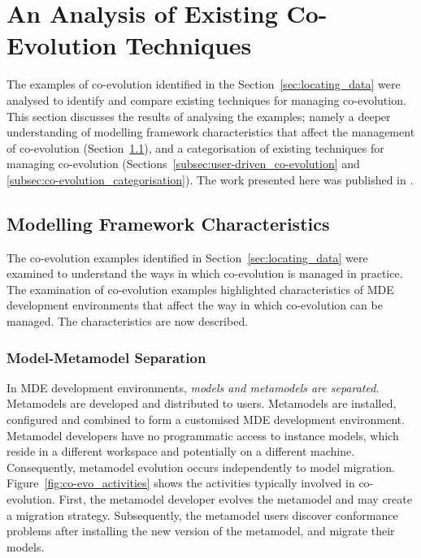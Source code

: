 \section{An Analysis of Existing Co-Evolution Techniques}
\label{sec:analysing_existing_techniques}
The examples of co-evolution identified in the Section~\ref{sec:locating_data} were analysed to identify and compare existing techniques for managing co-evolution. This section discusses the results of analysing the examples; namely a deeper understanding of modelling framework characteristics that affect the management of co-evolution (Section~\ref{subsec:modelling_framework_characteristics}), and a categorisation of existing techniques for managing co-evolution (Sections~\ref{subsec:user-driven_co-evolution} and \ref{subsec:co-evolution_categorisation}). The work presented here was published in \cite{rose09analysis,rose09enhanced}.


\subsection{Modelling Framework Characteristics}
\label{subsec:modelling_framework_characteristics}
The co-evolution examples identified in Section~\ref{sec:locating_data} were examined to understand the ways in which co-evolution is managed in practice. The examination of co-evolution examples highlighted characteristics of MDE development environments that affect the way in which co-evolution can be managed. The characteristics are now described.

\subsubsection{Model-Metamodel Separation}
In MDE development environments, \emph{models and metamodels are separated}. Metamodels are developed and distributed to users. Metamodels are installed, configured and combined to form a customised MDE development environment. Metamodel developers have no programmatic access to instance models, which reside in a different workspace and potentially on a different machine. Consequently, metamodel evolution occurs independently to model migration. Figure~\ref{fig:co-evo_activities} shows the activities typically involved in co-evolution. First, the metamodel developer evolves the metamodel and may create a migration strategy. Subsequently, the metamodel users discover conformance problems after installing the new version of the metamodel, and migrate their models.

